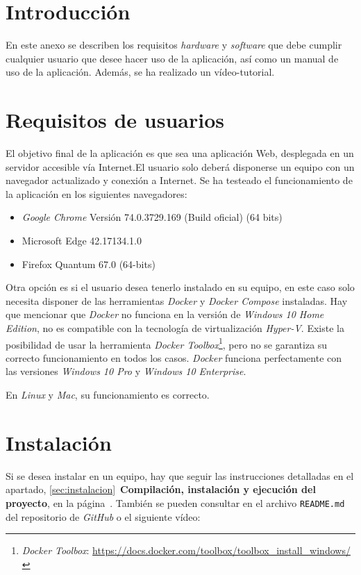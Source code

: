
\section{Introducción}
En este anexo se describen los requisitos \emph{hardware} y \emph{software} que debe cumplir cualquier usuario que desee hacer uso de la aplicación, así como un manual de uso de la aplicación. Además, se ha realizado un vídeo-tutorial.

\section{Requisitos de usuarios}
El objetivo final de la aplicación es que sea una aplicación Web, desplegada en un servidor accesible vía Internet.El usuario solo deberá disponerse un equipo con un navegador actualizado y conexión a Internet.
Se ha testeado el funcionamiento de la aplicación en los siguientes navegadores:
\begin{itemize}
\item \emph{Google Chrome} Versión 74.0.3729.169 (Build oficial) (64 bits)
\item Microsoft Edge 42.17134.1.0
\item Firefox Quantum 67.0 (64-bits)

\end{itemize}

Otra opción es si el usuario desea tenerlo instalado en su equipo, en este caso solo necesita disponer de las herramientas \emph{Docker} y \emph{Docker Compose} instaladas. Hay que mencionar que \emph{Docker} no funciona en la versión de \emph{Windows 10 Home Edition}, no es compatible con la tecnología de virtualización  \emph{Hyper-V}. Existe la posibilidad de usar la herramienta \emph{Docker Toolbox}\footnote{\textsl{Docker Toolbox}: \url{https://docs.docker.com/toolbox/toolbox_install_windows/}}, pero no se garantiza su correcto funcionamiento en todos los casos. \emph{Docker} funciona perfectamente con las versiones \emph{Windows 10 Pro} y \emph{Windows 10 Enterprise}.

En \emph{Linux} y \emph{Mac}, su funcionamiento es correcto.

\section{Instalación}
Si se desea instalar en un equipo, hay que seguir las instrucciones detalladas en el apartado, \ref{sec:instalacion}~\textbf{Compilación, instalación y ejecución del proyecto}, en la página~\pageref{sec:instalacion}. También se pueden consultar en el archivo  \texttt{README.md} del repositorio de \emph{GitHub} o el siguiente vídeo:

